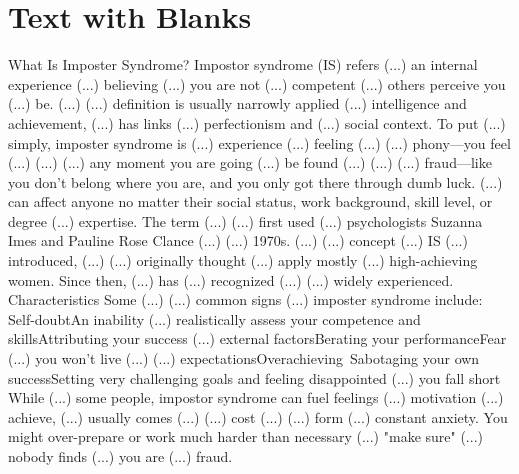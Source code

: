 \documentclass[14pt,a4paper]{extarticle}
\begin{document}
\section{Text with Blanks} What Is Imposter Syndrome? \newline\newline 
Impostor syndrome (IS) refers (...) an internal experience (...) believing (...) you are not (...) competent (...) others perceive you (...) be. (...) (...) definition is usually narrowly applied (...) intelligence and achievement, (...) has links (...) perfectionism and (...) social context.
\newline\newline 
To put (...) simply, imposter syndrome is (...) experience (...) feeling (...) (...) phony—you feel (...) (...) (...) any moment you are going (...) be found (...) (...) (...) fraud—like you don't belong where you are, and you only got there through dumb luck. (...) can affect anyone no matter their social status, work background, skill level, or degree (...) expertise.
\newline\newline 
The term (...) (...) first used (...) psychologists Suzanna Imes and Pauline Rose Clance (...) (...) 1970s.﻿﻿ (...) (...) concept (...) IS (...) introduced, (...) (...) originally thought (...) apply mostly (...) high-achieving women. Since then, (...) has (...) recognized (...) (...) widely experienced.
\newline\newline  Characteristics \newline\newline 
Some (...) (...) common signs (...) imposter syndrome include:
\newline\newline 
Self-doubtAn inability (...) realistically assess your competence and skillsAttributing your success (...) external factorsBerating your performanceFear (...) you won't live (...) (...) expectationsOverachieving Sabotaging your own successSetting very challenging goals and feeling disappointed (...) you fall short
\newline\newline 
While (...) some people, impostor syndrome can fuel feelings (...) motivation (...) achieve, (...) usually comes (...) (...) cost (...) (...) form (...) constant anxiety. You might over-prepare or work much harder than necessary (...) "make sure" (...) nobody finds (...) you are (...) fraud.
\newline\newline 
\end{document}
